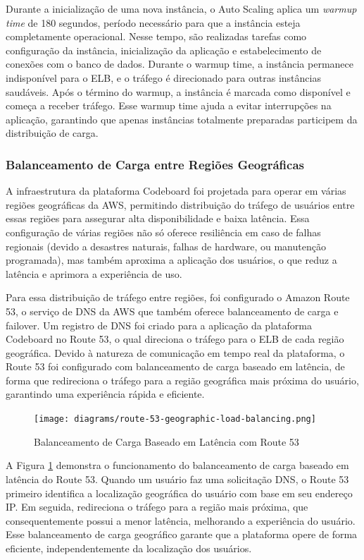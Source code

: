 Durante a inicialização de uma nova instância, o Auto Scaling aplica um \emph{warmup time} de 180 segundos, período necessário para que a instância esteja completamente operacional. Nesse tempo, são realizadas tarefas como configuração da instância, inicialização da aplicação e estabelecimento de conexões com o banco de dados. Durante o warmup time, a instância permanece indisponível para o ELB, e o tráfego é direcionado para outras instâncias saudáveis. Após o término do warmup, a instância é marcada como disponível e começa a receber tráfego. Esse warmup time ajuda a evitar interrupções na aplicação, garantindo que apenas instâncias totalmente preparadas participem da distribuição de carga.


\subsubsection{Balanceamento de Carga entre Regiões Geográficas}

A infraestrutura da plataforma Codeboard foi projetada para operar em várias regiões geográficas da AWS, permitindo distribuição do tráfego de usuários entre essas regiões para assegurar alta disponibilidade e baixa latência. Essa configuração de várias regiões não só oferece resiliência em caso de falhas regionais (devido a desastres naturais, falhas de hardware, ou manutenção programada), mas também aproxima a aplicação dos usuários, o que reduz a latência e aprimora a experiência de uso.

Para essa distribuição de tráfego entre regiões, foi configurado o Amazon Route 53, o serviço de DNS da AWS que também oferece balanceamento de carga e failover. Um registro de DNS foi criado para a aplicação da plataforma Codeboard no Route 53, o qual direciona o tráfego para o ELB de cada região geográfica. Devido à natureza de comunicação em tempo real da plataforma, o Route 53 foi configurado com balanceamento de carga baseado em latência, de forma que redireciona o tráfego para a região geográfica mais próxima do usuário, garantindo uma experiência rápida e eficiente. 

\begin{figure}[H]
    \centering
    \texttt{[image: diagrams/route-53-geographic-load-balancing.png]}
    \caption{Balanceamento de Carga Baseado em Latência com Route 53}
    \label{fig:route-53-geographic-load-balancing}
\end{figure}

A Figura \ref{fig:route-53-geographic-load-balancing} demonstra o funcionamento do balanceamento de carga baseado em latência do Route 53. Quando um usuário faz uma solicitação DNS, o Route 53 primeiro identifica a localização geográfica do usuário com base em seu endereço IP. Em seguida, redireciona o tráfego para a região mais próxima, que consequentemente possui a menor latência, melhorando a experiência do usuário. Esse balanceamento de carga geográfico garante que a plataforma opere de forma eficiente, independentemente da localização dos usuários.

